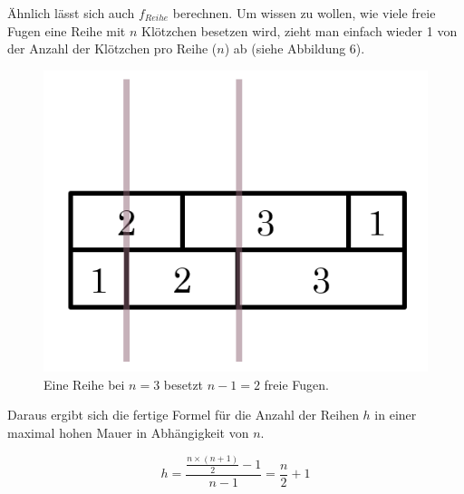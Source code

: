 \documentclass[a4paper,12pt]{article}
\begin{document}
Ähnlich lässt sich auch $f_{Reihe}$ berechnen. Um wissen zu wollen, wie viele freie Fugen eine Reihe mit $n$ Klötzchen besetzen wird, zieht man einfach wieder 1 von der Anzahl der Klötzchen pro Reihe ($n$) ab (siehe Abbildung 6).
\begin{figure}[H]
    \centering
    \includegraphics[width=0.5\linewidth]{Bilder/Aufgabe1/Definition_Fugenstellen_Reihe.png}
    \caption{Eine Reihe bei $n = 3$ besetzt $n-1 = 2$ freie Fugen.}
\end{figure}

Daraus ergibt sich die fertige Formel für die Anzahl der Reihen $h$ in einer maximal hohen Mauer in Abhängigkeit von $n$.
\begin{center}
\begin{Large}
\[h = \frac{\frac{n\times(n+1)}{2}-1}{n-1} = \frac{n}{2}+1\]
\end{Large}
\end{center}
\end{document}
